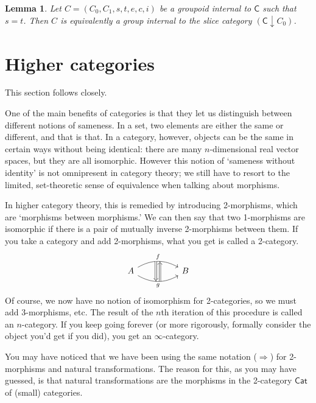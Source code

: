 \documentclass[a4paper]{report}
\theoremstyle{definition}
\theoremstyle{plain}
\newtheorem{lemma}{Lemma}[section]
\theoremstyle{remark}
\begin{document}
\begin{lemma}
  \label{lemma:interalgroupoidsaregroupobjectsinslicecategory}
  Let $C = (C_{0}, C_{1}, s, t, e, c, i)$ be a groupoid internal to $\mathsf{C}$ such that $s = t$. Then $C$ is equivalently a group internal to the slice category $(\mathsf{C} \downarrow C_{0})$.
\end{lemma}

\section{Higher categories} \label{sec:highercategories}
This section follows \cite{baez-higher-categories} closely.

One of the main benefits of categories is that they let us distinguish between different notions of sameness. In a set, two elements are either the same or different, and that is that. In a category, however, objects can be the same in certain ways without being identical: there are many $n$-dimensional real vector spaces, but they are all isomorphic. However this notion of `sameness without identity' is not omnipresent in category theory; we still have to resort to the limited, set-theoretic sense of equivalence when talking about morphisms.

In higher category theory, this is remedied by introducing 2-morphisms, which are `morphisms between morphisms.' We can then say that two 1-morphisms are isomorphic if there is a pair of mutually inverse 2-morphisms between them. If you take a category and add 2-morphisms, what you get is called a 2-category.
\begin{equation*}
  \begin{tikzcd}[row sep=huge, column sep=huge]
    A 
    \arrow[r, bend left, "f", ""{name=UL, anchor=south east}, ""{name=UR, anchor=south west}]
    \arrow[r, swap, bend right, "g", ""{name=DL, anchor=north east}, ""{name=DR, anchor=north west}]
    \arrow[Rightarrow, from=UL , to=DL,] 
    \arrow[Leftarrow, from=UR , to=DR,] 
    & B
  \end{tikzcd}
\end{equation*}
Of course, we now have no notion of isomorphism for 2-categories, so we must add 3-morphisms, etc. The result of the $n$th iteration of this procedure is called an $n$-category. If you keep going forever (or more rigorously, formally consider the object you'd get if you did), you get an $\infty$-category.

You may have noticed that we have been using the same notation ($\Rightarrow$) for 2-morphisms and natural transformations. The reason for this, as you may have guessed, is that natural transformations are the morphisms in the 2-category $\mathsf{Cat}$ of (small) categories.
\end{document}
